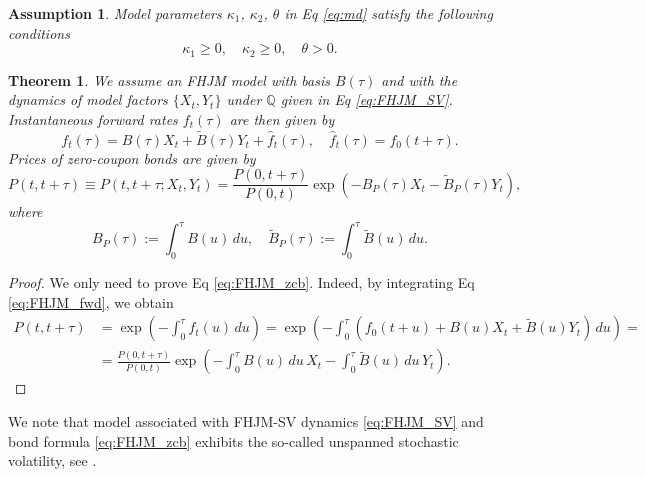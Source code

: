 \documentclass[pdftex,11pt,a4paper] {article}
\newtheorem{theorem}{Theorem}[section]
\newtheorem{assumption}{Assumption}[section]
\begin{document}
\begin{assumption}
Model parameters $\kappa_1$, $\kappa_2$, $\theta$ in Eq \eqref{eq:md} satisfy the following conditions
\begin{equation}\label{eq:param_constraint_logsv}
\kappa_1\ge 0,\quad \kappa_2\ge 0,\quad \theta>0.
\end{equation}
\end{assumption}


\begin{theorem}\label{thm:zcb}
We assume an FHJM model with basis $B(\tau)$ and with the dynamics of model factors $\{X_t, Y_t\}$ under $\mathbb{Q}$ given in Eq \eqref{eq:FHJM_SV}. 
Instantaneous forward rates $f_t(\tau)$ are then given by
\begin{equation}\label{eq:FHJM_fwd}
f_{t}(\tau) = B(\tau) X_{t} + \tilde{B}(\tau) Y_{t}  +  \hat f_t(\tau),\quad \hat f_t(\tau)=f_{0}(t+\tau).
\end{equation}
Prices of zero-coupon bonds are given by
\begin{equation}\label{eq:FHJM_zcb}
P(t,t+\tau) \equiv P(t,t+\tau; X_t, Y_t) = \frac{P(0,t+\tau)}{P(0,t)}\exp\left(-B_P(\tau) X_{t} - \tilde{B}_P(\tau) Y_{t}\right),
\end{equation}
where 
\begin{equation}\label{eq:FHJM_zcb_coeffs}
B_P(\tau):=\int_0^\tau B(u)\,du,\quad \tilde B_P(\tau):=\int_0^\tau \tilde B(u)\,du.
\end{equation}
\end{theorem}
\begin{proof}
We only need to prove Eq \eqref{eq:FHJM_zcb}. Indeed, by integrating Eq \eqref{eq:FHJM_fwd}, we obtain
\begin{equation*}
\begin{split}
P(t,t+\tau)&=\exp\left(-\int_0^\tau f_t(u)\,du\right)=
\exp\left(-\int_0^\tau \left(f_0(t+u)+B(u)X_t+\tilde B(u)Y_t\right)\,du\right)=\\
&=\frac{P(0,t+\tau)}{P(0,t)}\exp\left(-\int_0^\tau B(u)\,du\,X_t-\int_0^\tau\tilde B(u)\,du\,Y_t\right).
\end{split}
\end{equation*}

\end{proof}

We note that model associated with FHJM-SV dynamics \eqref{eq:FHJM_SV} and bond formula \eqref{eq:FHJM_zcb} exhibits the so-called unspanned stochastic volatility, see \cite{CollinDufresne2002}.
\end{document}

